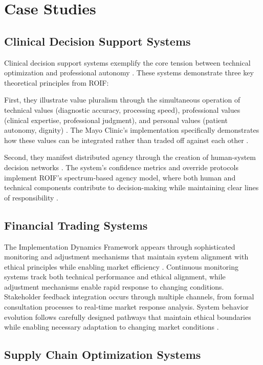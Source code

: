 \documentclass[12pt]{article}
\begin{document}
\section{Case Studies}

\subsection{Clinical Decision Support Systems}

Clinical decision support systems exemplify the core tension between technical optimization and professional autonomy \parencite{bates2003}. These systems demonstrate three key theoretical principles from ROIF:

First, they illustrate value pluralism through the simultaneous operation of technical values (diagnostic accuracy, processing speed), professional values (clinical expertise, professional judgment), and personal values (patient autonomy, dignity) \parencite{ash2004}. The Mayo Clinic's implementation specifically demonstrates how these values can be integrated rather than traded off against each other \parencite{friedman2019}.

Second, they manifest distributed agency through the creation of human-system decision networks \parencite{verbeek2011}. The system's confidence metrics and override protocols implement ROIF's spectrum-based agency model, where both human and technical components contribute to decision-making while maintaining clear lines of responsibility \parencite{johnson2005}.

\subsection{Financial Trading Systems}

The Implementation Dynamics Framework appears through sophisticated monitoring and adjustment mechanisms that maintain system alignment with ethical principles while enabling market efficiency \parencite{pasquale2015}. Continuous monitoring systems track both technical performance and ethical alignment, while adjustment mechanisms enable rapid response to changing conditions. Stakeholder feedback integration occurs through multiple channels, from formal consultation processes to real-time market response analysis. System behavior evolution follows carefully designed pathways that maintain ethical boundaries while enabling necessary adaptation to changing market conditions \parencite{dignum2019}.

\subsection{Supply Chain Optimization Systems}
\end{document}
